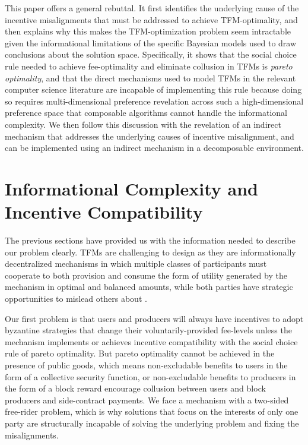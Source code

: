 \documentclass[sigconf,anonymous]{aamas}
\begin{document}
This paper offers a general rebuttal. It first identifies the underlying cause of the incentive misalignments that must be addressed to achieve TFM-optimality, and then explains why this makes the TFM-optimization problem seem intractable given the informational limitations of the specific Bayesian models used to draw conclusions about the solution space. Specifically, it shows that the social choice rule needed to achieve fee-optimality and eliminate collusion in TFMs is \textit{pareto optimality}, and that the direct mechanisms used to model TFMs in the relevant computer science literature are incapable of implementing this rule because doing so requires multi-dimensional preference revelation across such a high-dimensional preference space that composable algorithms cannot handle the informational complexity. We then follow this discussion with the revelation of an indirect mechanism that addresses the underlying causes of incentive misalignment, and can be implemented using an indirect mechanism in a decomposable environment.


\section{Informational Complexity and Incentive Compatibility\label{sec::section1p3}}

The previous sections have provided us with the information needed to describe our problem clearly. TFMs are challenging to design as they are informationally decentralized mechanisms in which multiple classes of participants must cooperate to both provision and consume the form of utility generated by the mechanism in optimal and balanced amounts, while both parties have strategic opportunities to mislead others about .

Our first problem is that users and producers will always have incentives to adopt byzantine strategies that change their voluntarily-provided fee-levels unless the mechanism implements or achieves incentive compatibility with the social choice rule of pareto optimality. But pareto optimality cannot be achieved in the presence of public goods, which means non-excludable benefits to users in the form of a collective security function, or non-excludable benefits to producers in the form of a block reward encourage collusion between users and block producers and side-contract payments. We face a mechanism with a two-sided free-rider problem, which is why solutions that focus on the interests of only one party are structurally incapable of solving the underlying problem and fixing the misalignments.
\end{document}
